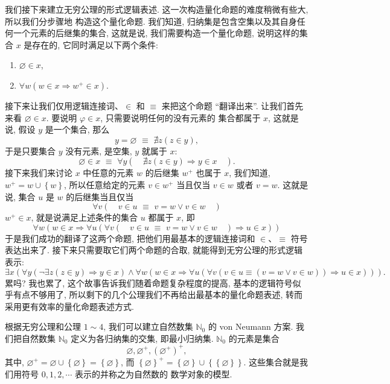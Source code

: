 \documentclass[10pt,UTF8]{book} %
\begin{document}
我们接下来建立无穷公理的形式逻辑表述. 这一次构造量化命题的难度稍微有些大, 所以我们分步骤地
构造这个量化命题. 我们知道, 归纳集是包含空集以及其自身任何一个元素的后继集的集合, 这就是说,
我们需要构造一个量化命题, 说明这样的集合 $x$ 是存在的, 它同时满足以下两个条件:
\begin{enumerate}[label={${\arabic*}^\circ$}, itemsep=0pt]
    \item $\varnothing \in x$,
    \item $\forall w \left( w \in x \Rightarrow w^+ \in x \right)$.
\end{enumerate}
接下来让我们仅用逻辑连接词、$\in$ 和 $\equiv$ 来把这个命题 “翻译出来”.
让我们首先来看 $\varnothing \in x$. 要说明 $\varphi \in x$, 只需要说明任何的没有元素的
集合都属于 $x$, 这就是说, 假设 $y$ 是一个集合, 那么
\[ y = \varnothing \,\,\equiv\,\, \nexists z(z \in y), \]
于是只要集合 $y$ 没有元素, 是空集, $y$ 就属于 $x$:
\[ \varnothing \in x \,\,\equiv\,\, \forall y \left( \quad \nexists z(z \in y)
\Rightarrow y \in x \quad \right). \]
接下来我们来讨论 $x$ 中任意的元素 $w$ 的后继集 $w^+$ 也属于 $x$, 我们知道,
$w^+ = w \cup \left\{w\right\}$, 所以任意给定的元素 $v \in w^+$ 当且仅当 $v \in w$
或者 $v = w$. 这就是说, 集合 $u$ 是 $w$ 的后继集当且仅当
\[ \forall v \left( \quad v \in u \,\,\equiv\,\, v=w \vee v \in w \quad \right) \]
$w^+ \in x$, 就是说满足上述条件的集合 $u$ 都属于 $x$, 即
\[ \forall w \left(
    w \in x \Rightarrow \forall u \left(
        \forall v \left( \quad v \in u \,\,\equiv\,\, v=w \vee v \in w \quad \right)
        \Rightarrow u \in x
    \right)
\right) \]
于是我们成功的翻译了这两个命题, 把他们用最基本的逻辑连接词和 $\in$、$\equiv$ 符号表达出来了.
接下来只需要取它们两个命题的合取, 就能得到无穷公理的形式逻辑表示:
\[ \exists x \left(
    \forall y \left(
        \lnot \exists z \left( z \in y \right)
        \Rightarrow y \in x
    \right) \wedge \forall w \left(
        w \in x \Rightarrow \forall u \left(
            \forall v \left(
                v \in u \equiv \left(
                    v = w \vee v \in w
                \right) 
            \right)
            \Rightarrow u \in x
        \right)
    \right)
\right). \]
累吗? 我也累了, 这个故事告诉我们随着命题复杂程度的提高, 基本的逻辑符号似乎有点不够用了,
所以剩下的几个公理我们不再给出最基本的量化命题表述,
转而采用更有效率的量化命题表述方式.

\begin{example}
    根据无穷公理和公理 $1 \sim 4$, 我们可以建立自然数集 $\mathbb{N}_0$ 的 von 
    Neumann 方案. 我们把自然数集 $\mathbb{N}_0$ 定义为各归纳集的交集, 即最小归纳集.
    $\mathbb{N}_0$ 的元素是集合
    \[ \varnothing, \varnothing^+, \left( \varnothing^+ \right)^+, \]
    其中, $\varnothing^+ = \varnothing \cup \left\{ \varnothing \right\}
    = \left\{ \varnothing \right\}$, 而 $\left\{ \varnothing \right\}^+
    = \left\{ \varnothing \right\} \cup \left\{ 
        \left\{ \varnothing \right\}
    \right\}$. 这些集合就是我们用符号 $0,1,2,\cdots$ 表示的并称之为自然数的
    数学对象的模型.
\end{example}
\end{document}

